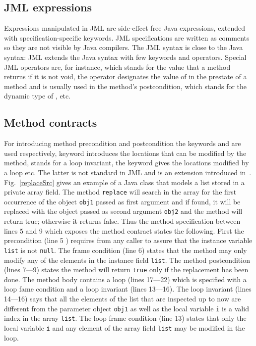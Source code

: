 \subsection{JML expressions}\label{javaVerif:JML:expression}   
    Expressions manipulated in JML  
    are side-effect free Java expressions, extended with
    specification-specific keywords. JML specifications are written as comments so they are not
    visible by Java compilers. The JML syntax is close to the Java syntax: JML extends the Java
    syntax with few keywords and operators. 
    Special JML operators are, for instance,  which stands for the value that a method returns if it is not
    void, the  operator 
    designates the value of  in the prestate of a method and is usually
    used in the method's postcondition,  which stands for the dynamic type of  , etc.


\subsection{Method contracts}\label{javaVerif:JML:methodContracts}     
For introducing method precondition and postcondition the keywords  and  are used  
    respectively,   keyword introduces the locations that can be modified by the method, 
     stands for a loop invariant, the  keyword gives the 
    locations modified by a loop etc. The latter is not standard in JML and is an extension introduced in~\cite{BRL-JACK}.
Fig.~\ref{replaceSrc} gives an example of a Java class that models a list stored in a private array field. 
The method \texttt{replace} will search in the array for the first occurrence of the object \texttt{obj1} passed as first argument
 and if found, it will be replaced with the object passed as second argument \texttt{obj2} and the method will return true; otherwise it 
returns false. Thus the method  specification between lines 5 and 9 which exposes the method contract states the following.
First the precondition (line 5 ) requires from any caller to assure that the instance variable \texttt{list} is not \texttt{null}.
The frame condition (line  6) states that the method may only
modify any of the elements in the instance field \texttt{list}. The method postcondition (lines 7---9) states the method will return 
\texttt{true} only if  the replacement has been done.
The method body contains a loop (lines 17---22) which is specified with a loop fame condition and a loop invariant (lines 13---16).
  The loop invariant (lines 14---16) says that all the elements of the list that are inspected up to now are 
different from the parameter object \texttt{obj1} as well as the local variable \texttt{i}  is a valid index in the array \texttt{list}.
The loop frame condition (line 13)  states that only
 the local variable \texttt{i} and any element of the array field \texttt{list} may be modified in the loop.

